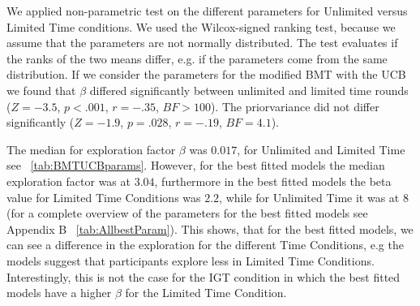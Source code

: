 We applied non-parametric test on the different parameters for Unlimited versus Limited Time conditions. We used the Wilcox-signed ranking test, because we assume that the parameters are not normally distributed. The test evaluates if the ranks of the two means differ, e.g. if the parameters come from the same distribution. 
If we consider the parameters for the modified BMT with the UCB we found that $\beta$ differed significantly between unlimited and limited time rounds ($Z=-3.5$, $p<.001$, $r=-.35$, $BF>100$). The priorvariance did not differ significantly ($Z=-1.9$, $p=.028$, $r=-.19$, $BF=4.1$).

The median for exploration factor $\beta$ was $0.017$, for Unlimited and Limited Time see ~\ref{tab:BMTUCBparams}. However, for the best fitted models the median exploration factor was at $3.04$, furthermore in the best fitted models the beta value for Limited Time Conditions was $2.2$, while for Unlimited Time it was at $8$ (for a complete overview of the parameters for the best fitted models see Appendix B ~\ref{tab:AllbestParam}). This shows, that for the best fitted models, we can see a difference in the exploration for the different Time Conditions, e.g the models suggest that participants explore less in Limited Time Conditions. Interestingly, this is not the case for the IGT condition in which the best fitted models have a higher $\beta$ for the Limited Time Condition.


